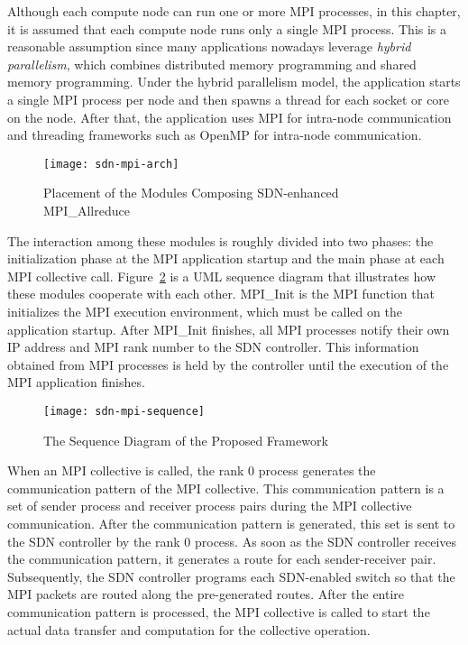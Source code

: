 Although each compute node can run one or more MPI processes, in this chapter,
it is assumed that each compute node runs only a single MPI process. This is a
reasonable assumption since many applications nowadays leverage \emph{hybrid
parallelism}, which combines distributed memory programming and shared memory
programming. Under the hybrid parallelism model, the application starts a
single MPI process per node and then spawns a thread for each socket or core
on the node. After that, the application uses MPI for intra-node communication
and threading frameworks such as OpenMP for intra-node communication.

\begin{figure}
    \centering
    \texttt{[image: sdn-mpi-arch]}
    \caption{Placement of the Modules Composing SDN-enhanced MPI\_Allreduce}%
    \label{fig:proposal-placement}
\end{figure}

The interaction among these modules is roughly divided into two phases: the
initialization phase at the MPI application startup and the main phase at each
MPI collective call. Figure~\ref{fig:proposal-sequence} is a UML sequence
diagram that illustrates how these modules cooperate with each other.
MPI\_Init is the MPI function that initializes the MPI execution environment,
which must be called on the application startup. After MPI\_Init finishes, all
MPI processes notify their own IP address and MPI rank number to the SDN
controller. This information obtained from MPI processes is held by the
controller until the execution of the MPI application finishes.

\begin{figure}
    \centering
    \texttt{[image: sdn-mpi-sequence]}
    \caption{The Sequence Diagram of the Proposed Framework}%
    \label{fig:proposal-sequence}
\end{figure}

When an MPI collective is called, the rank 0 process generates the
communication pattern of the MPI collective. This communication pattern is a
set of sender process and receiver process pairs during the MPI collective
communication. After the communication pattern is generated, this set is sent
to the SDN controller by the rank 0 process. As soon as the SDN controller
receives the communication pattern, it generates a route for each
sender-receiver pair. Subsequently, the SDN controller programs each
SDN-enabled switch so that the MPI packets are routed along the pre-generated
routes. After the entire communication pattern is processed, the MPI
collective is called to start the actual data transfer and computation for the
collective operation.

